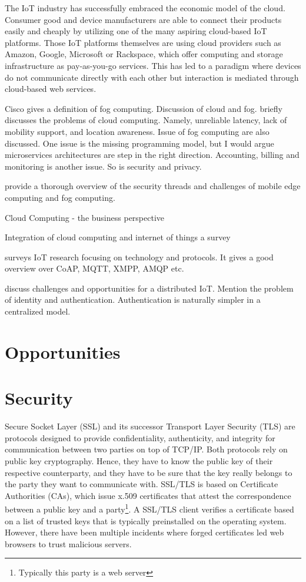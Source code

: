 The IoT industry has successfully embraced the economic model of the cloud. Consumer good and device manufacturers are able to connect their products easily and cheaply by utilizing one of the many aspiring cloud-based IoT platforms. Those IoT platforms themselves are using cloud providers such as Amazon, Google, Microsoft or Rackspace, which offer computing and storage infrastructure as pay-as-you-go services. This has led to a paradigm where devices do not communicate directly with each other but interaction is mediated through cloud-based web services.

Cisco gives a definition of fog computing.
Discussion of cloud and fog. \cite{Yi:2015:SFC:2757384.2757397} briefly discusses the problems of cloud computing. Namely, unreliable latency, lack of mobility support, and location awareness. Issue of fog computing are also discussed. One issue is the missing programming model, but I would argue microservices architectures are step in the right direction. Accounting, billing and monitoring is another issue. So is security and privacy.


\cite{DBLP:journals/corr/RomanLM16} provide a thorough overview of the security threads and challenges of mobile edge computing and fog computing.


Cloud Computing - the business perspective\cite{Marston2011176}

Integration of cloud computing and internet of things a survey \cite{botta2016integration}

\cite{7123563} surveys IoT research focusing on technology and protocols. It gives a good overview over CoAP, MQTT, XMPP, AMQP etc.

\cite{Roman20132266} discuss challenges and opportunities for a distributed IoT. Mention the problem of identity and authentication. Authentication is naturally simpler in a centralized model.

\section{Opportunities}

\section{Security}

Secure Socket Layer (SSL) and its successor Transport Layer Security (TLS) are protocols designed to provide confidentiality, authenticity, and integrity for communication between two parties on top of TCP/IP. Both protocols rely on public key cryptography. Hence, they have to know the public key of their respective counterparty, and they have to be sure that the key really belongs to the party they want to communicate with. SSL/TLS is based on Certificate Authorities (CAs), which issue x.509 certificates that attest the correspondence between a public key and a party\footnote{Typically this party is a web server}. A SSL/TLS client verifies a certificate based on a list of trusted keys that is typically preinstalled on the operating system. However, there have been multiple incidents where forged certificates led web browsers to trust malicious servers. 


